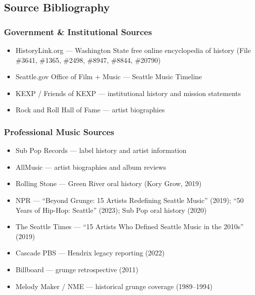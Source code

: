 \documentclass[11pt,letterpaper]{article}
\begin{document}
\subsection{Source Bibliography}

\subsubsection{Government \& Institutional Sources}
\begin{itemize}[nosep]
  \item HistoryLink.org --- Washington State free online encyclopedia of history (File \#3641, \#1365, \#2498, \#8947, \#8844, \#20790)
  \item Seattle.gov Office of Film + Music --- Seattle Music Timeline
  \item KEXP / Friends of KEXP --- institutional history and mission statements
  \item Rock and Roll Hall of Fame --- artist biographies
\end{itemize}

\subsubsection{Professional Music Sources}
\begin{itemize}[nosep]
  \item Sub Pop Records --- label history and artist information
  \item AllMusic --- artist biographies and album reviews
  \item Rolling Stone --- Green River oral history (Kory Grow, 2019)
  \item NPR --- ``Beyond Grunge: 15 Artists Redefining Seattle Music'' (2019); ``50 Years of Hip-Hop: Seattle'' (2023); Sub Pop oral history (2020)
  \item The Seattle Times --- ``15 Artists Who Defined Seattle Music in the 2010s'' (2019)
  \item Cascade PBS --- Hendrix legacy reporting (2022)
  \item Billboard --- grunge retrospective (2011)
  \item Melody Maker / NME --- historical grunge coverage (1989--1994)
\end{itemize}
\end{document}
